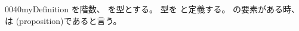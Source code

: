 \documentclass[index]{subfiles}
\begin{document}
\begin{myBlock}{0040}{myDefinition}
  を階数、
  を型とする。
  型を
  と定義する。
  の要素がある時、は
  (proposition)であると言う。
\end{myBlock}
\end{document}
